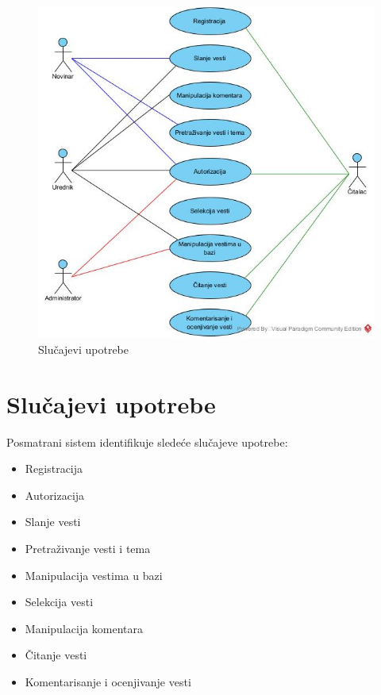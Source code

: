 \documentclass{article}
\begin{document}
\begin{figure}[htbp!]
\centering
\includegraphics[scale=0.7]{Slucajevi upotrebe}
\caption{Slučajevi upotrebe}
\label{slk:dtp}
\end{figure}

\newpage

\section{Slučajevi upotrebe}
\indent Posmatrani sistem identifikuje sledeće slučajeve upotrebe:
\begin{itemize} 
\item Registracija
\item Autorizacija 
\item Slanje vesti
\item Pretraživanje vesti i tema
\item Manipulacija vestima u bazi
\item Selekcija vesti 
\item Manipulacija komentara
\item Čitanje vesti
\item Komentarisanje i ocenjivanje vesti

\end{itemize}
\end{document}
